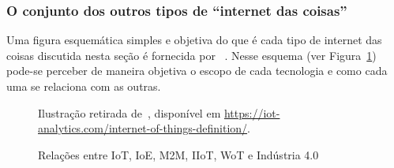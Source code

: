 \documentclass[pdftex, brazil, 12pt, twoside]{article}
\begin{document}
\subsubsection{O conjunto dos outros tipos de ``internet das coisas''}
\label{o-que-e-iot-outros-tipos-conjunto}

Uma figura esquemática simples e objetiva do que é cada tipo de internet das coisas
discutida nesta seção é fornecida por ~\citet{LuethIoT2014}. Nesse esquema
(ver Figura~\ref{fig:outras-iot}) pode-se
perceber de maneira objetiva o escopo de cada tecnologia e como cada uma se relaciona
com as outras.

\begin{figure}[h]
  \begin{center}
    \caption{Relações entre IoT, IoE, M2M, IIoT, WoT e Indústria 4.0}
    \label{fig:outras-iot}
    
    \footnotesize{Ilustração retirada de~\citet{LuethIoT2014},
      disponível em \url{https://iot-analytics.com/internet-of-things-definition/}.}
  \end{center}
\end{figure}





\end{document}
